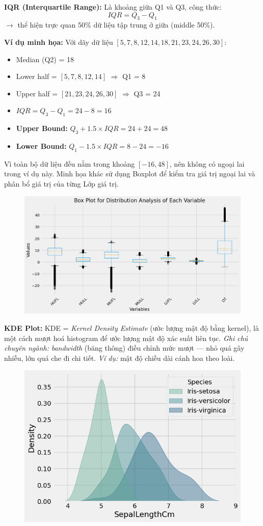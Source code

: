 \documentclass[11pt]{article}
\begin{document}
\noindent \textbf{IQR (Interquartile Range):} Là khoảng giữa Q1 và Q3, công thức:
\[
IQR = Q_{3} - Q_{1}
\]
$\rightarrow$ thể hiện trực quan 50\% dữ liệu tập trung ở giữa (middle 50\%).

\medskip
\textbf{Ví dụ minh họa:} Với dãy dữ liệu \([5, 7, 8, 12, 14, 18, 21, 23, 24, 26, 30]\):
\begin{itemize}
    \item Median (Q2) = 18
    \item Lower half = \([5, 7, 8, 12, 14]\) $\Rightarrow$ Q1 = 8
    \item Upper half = \([21, 23, 24, 26, 30]\) $\Rightarrow$ Q3 = 24
    \item $IQR = Q_{3} - Q_{1} = 24 - 8 = 16$
    \item \textbf{Upper Bound:} $Q_{3} + 1.5 \times IQR = 24 + 24 = 48$
    \item \textbf{Lower Bound:} $Q_{1} - 1.5 \times IQR = 8 - 24 = -16$
\end{itemize}

\noindent Vì toàn bộ dữ liệu đều nằm trong khoảng \([-16, 48]\), nên không có ngoại lai trong ví dụ này.
Minh họa khác sử dụng Boxplot để kiểm tra giá trị ngoại lai và phân bổ giá trị của từng Lớp giá trị.

\begin{figure}[H]
    \centering
    \includegraphics[width=0.5\linewidth]{images/BoxP.png}
\end{figure}


\medskip
\textbf{KDE Plot:} KDE = \emph{Kernel Density Estimate} (ước lượng mật độ bằng kernel), là một cách mượt hoá histogram để ước lượng mật độ xác suất liên tục.
\textit{Ghi chú chuyên ngành:} \emph{bandwidth} (băng thông) điều chỉnh mức mượt — nhỏ quá gây nhiễu, lớn quá che đi chi tiết.
\textit{Ví dụ:} mật độ chiều dài cánh hoa theo loài.
\begin{figure}[H]
    \centering
    \includegraphics[width=0.4\linewidth]{images/KernelDensityEstimate_Plot.png}
\end{figure}
\end{document}
